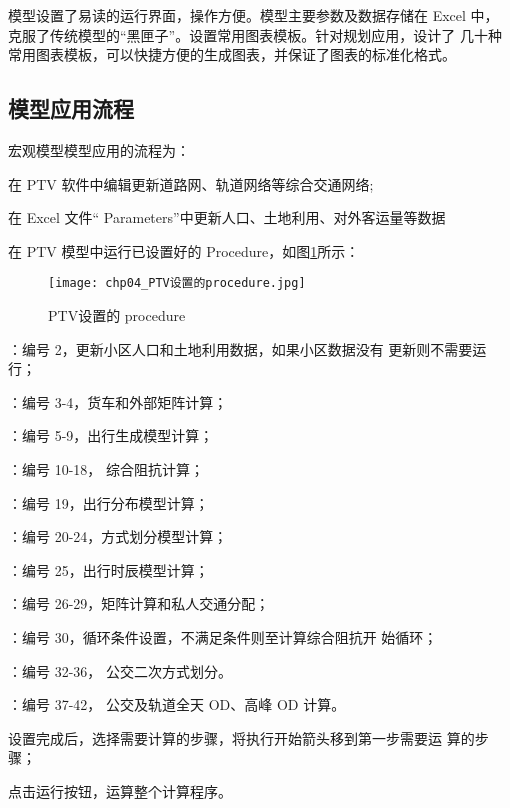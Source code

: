 模型设置了易读的运行界面，操作方便。模型主要参数及数据存储在 Excel
中，克服了传统模型的“黑匣子”。设置常用图表模板。针对规划应用，设计了
几十种常用图表模板，可以快捷方便的生成图表，并保证了图表的标准化格式。

\subsection{模型应用流程}
宏观模型模型应用的流程为：
\begin{nbeae}
\item 在 PTV 软件中编辑更新道路网、轨道网络等综合交通网络;
\item 在 Excel 文件“ Parameters”中更新人口、土地利用、对外客运量等数据
\item 在 PTV 模型中运行已设置好的 Procedure，如图\ref{fig:chp04_PTV设置的procedure.jpg}所示：
\end{nbeae}

\begin{figure}[!ht]
  \centering
  \texttt{[image: chp04\_PTV设置的procedure.jpg]}
  \caption{PTV设置的 procedure\label{fig:chp04_PTV设置的procedure.jpg} }
\end{figure}

\begin{cit}
\item {}：编号 2，更新小区人口和土地利用数据，如果小区数据没有
更新则不需要运行；
\item {}：编号 3-4，货车和外部矩阵计算；
\item {}：编号 5-9，出行生成模型计算；
\item {}：编号 10-18， 综合阻抗计算；
\item {}：编号 19，出行分布模型计算；
\item {}：编号 20-24，方式划分模型计算；
\item {}：编号 25，出行时辰模型计算；
\item {}：编号 26-29，矩阵计算和私人交通分配；
\item {}：编号 30，循环条件设置，不满足条件则至计算综合阻抗开
始循环；
\item {}：编号 32-36， 公交二次方式划分。
\item {}：编号 37-42， 公交及轨道全天 OD、高峰 OD 计算。
\item 设置完成后，选择需要计算的步骤，将执行开始箭头移到第一步需要运
算的步骤；
\item 点击运行按钮，运算整个计算程序。
\end{cit}


